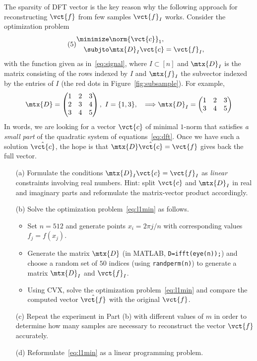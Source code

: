 \documentclass{article}
\begin{document}
The sparsity of DFT vector is the key reason why the following approach for reconstructing $\vct{f}$ from few samples $\vct{f}_I$ works. Consider the optimization problem
\begin{align}\label{eq:l1min}\tag{5}
\begin{split}
 \minimize & \norm{\vct{c}}_1,\\
 \subjto & \mtx{D}_I\vct{c} = \vct{f}_I,
\end{split}
 \end{align}
with the function given as in~\eqref{eq:signal}, where $I\subset[n]$ and $\mtx{D}_I$ is the matrix consisting of the rows indexed by $I$ and $\mtx{f}_I$ the subvector indexed by the entries of $I$ (the red dots in Figure~\ref{fig:subsample}). For example,
\begin{equation*}
 \mtx{D} = \begin{pmatrix} 1 & 2 & 3\\
            2 & 3 & 4\\
            3 & 4 & 5
           \end{pmatrix},
\ I=\{1,3\}, \quad \Longrightarrow \mtx{D}_I = \begin{pmatrix} 1 & 2 & 3\\
            3 & 4 & 5
           \end{pmatrix}
\end{equation*}
In words, we are looking for a vector $\vct{c}$ of minimal $1$-norm that satisfies {\em a small part} of the quadratic system of equations~\eqref{eq:dft}. Once we have such a solution $\hat{\vct{c}}$, the hope is that $\mtx{D}\hat{\vct{c}}=\vct{f}$ gives back the full vector. 

\begin{itemize}
 \item[(a)] Formulate the conditions $\mtx{D}_I\vct{c}=\vct{f}_I$ as {\em linear} constraints involving real numbers. Hint: split $\vct{c}$ and $\mtx{D}_I$ in real and imaginary parts and reformulate the matrix-vector product accordingly.
\item[(b)] Solve the optimization problem~\eqref{eq:l1min} as follows.
\begin{itemize}
\item Set $n=512$ and generate points $x_i=2\pi j/n$ with corresponding values $f_j=f(x_j)$. 
\item Generate the matrix $\mtx{D}$ (in MATLAB, {\tt D=ifft(eye(n));}) and
choose a random set of $50$ indices (using {\tt randperm(n)}) to generate a matrix $\mtx{D}_I$ and $\vct{f}_I$. 
\item Using CVX, solve the optimization problem~\eqref{eq:l1min} and compare the computed vector $\hat{\vct{f}}$ with the original $\vct{f}$.
\end{itemize}
\item[(c)] Repeat the experiment in Part (b) with different values of $m$ in order to determine how many samples are necessary to reconstruct the vector $\vct{f}$ accurately.
\item[(d)] Reformulate~\eqref{eq:l1min} as a linear programming problem.
\end{itemize}
\end{document}

